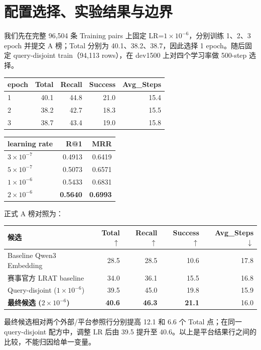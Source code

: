\documentclass[UTF8,a4paper,10pt]{ctexart}
\begin{document}
\section{配置选择、实验结果与边界}
我们先在完整 96,504 条 Training pairs 上固定 LR=$1\times10^{-6}$，分别训练 1、2、3 epoch 并提交 A 榜；Total 分别为 40.1、38.2、38.7，因此选择 1 epoch。随后固定 query-disjoint train（94,113 rows），在 dev1500 上对四个学习率做 500-step 选择。

\begin{center}
\small
\begin{tabular}{lrrrr}
\toprule
epoch & Total & Recall & Success & Avg\_Steps \\
\midrule
1 & 40.1 & 44.8 & 21.0 & 15.4 \\
2 & 38.2 & 42.7 & 18.3 & 15.5 \\
3 & 38.7 & 43.4 & 19.0 & 15.8 \\
\bottomrule
\end{tabular}
\quad
\begin{tabular}{lrr}
\toprule
learning rate & R@1 & MRR \\
\midrule
$3\times10^{-7}$ & 0.4913 & 0.6419 \\
$5\times10^{-7}$ & 0.5073 & 0.6571 \\
$1\times10^{-6}$ & 0.5433 & 0.6831 \\
\textbf{$2\times10^{-6}$} & \textbf{0.5640} & \textbf{0.6993} \\
\bottomrule
\end{tabular}
\end{center}
\smallskip
\noindent\footnotesize
正式 A 榜对照为：
\begin{center}
\small
\begin{tabular}{lrrrr}
\toprule
候选 & Total $\uparrow$ & Recall $\uparrow$ & Success $\uparrow$ & Avg\_Steps $\downarrow$ \\
\midrule
Baseline Qwen3 Embedding & 28.5 & 28.5 & 10.6 & 17.8 \\
赛事官方 LRAT baseline & 34.0 & 36.1 & 15.5 & 16.8 \\
Query-disjoint ($1\times10^{-6}$) & 39.5 & 45.0 & 19.8 & 15.9 \\
\textbf{最终候选 ($2\times10^{-6}$)} & \textbf{40.6} & \textbf{46.3} & \textbf{21.1} & 16.0 \\
\bottomrule
\end{tabular}
\end{center}
最终候选相对两个外部/平台参照行分别提高 12.1 和 6.6 个 Total 点；在同一 query-disjoint 配方中，调整 LR 后由 39.5 提升至 40.6。以上是平台结果行之间的比较，不能归因给单一变量。
\end{document}
